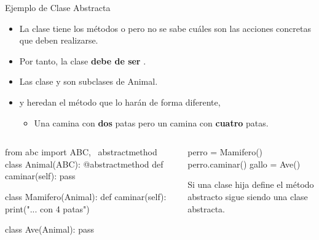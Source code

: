 \documentclass[10pt, envcountsect , spanish]{beamer}
\begin{document}
\begin{frame}[fragile]{Ejemplo de Clase Abstracta} 

\unEjemplo
\begin{itemize}
\item La clase  tiene los métodos  o  pero no se sabe cuáles son las acciones concretas que deben realizarse.
\item Por tanto, la clase   \textbf{debe de ser} .
\item Las clase  y  son subclases de Animal.
\item {} y  heredan el método  que lo harán de forma diferente, 
\begin{itemize}
\item Una  camina con \textbf{dos} patas pero un  camina con \textbf{cuatro} patas.
\end{itemize}
\end{itemize}

\footnotesize
\begin{columns}
\begin{column}{.45\textwidth}
\begin{pyconsole}[][frame=single, fontsize=\scriptsize]
from abc import ABC, \
        abstractmethod
class Animal(ABC):
  @abstractmethod
  def caminar(self):
    pass
    
class Mamifero(Animal):
  def caminar(self):
    print("... con 4 patas")
    
class Ave(Animal):
  pass

 \end{pyconsole}
\end{column}
\begin{column}{.54\textwidth}  
\begin{pyconsole}[][frame=single, fontsize=\scriptsize] 
perro = Mamifero()
perro.caminar()
gallo = Ave()
\end{pyconsole}

\normalsize
Si una clase hija  define el método abstracto sigue siendo una clase abstracta.

\end{column}
\end{columns}

\end{frame}
\end{document}
